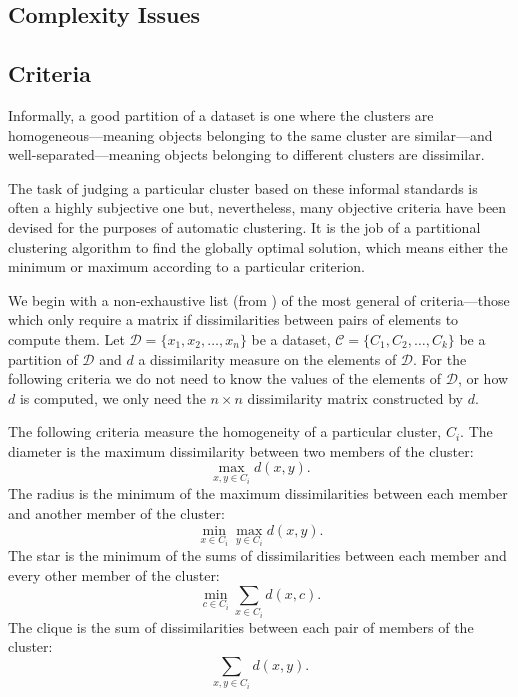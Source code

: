 \documentclass[a4paper]{report}
\newcommand{\dset}{\mathcal{D}}
\newcommand{\clus}{\mathcal{C}}
\begin{document}
\subsection{Complexity Issues}
\label{sec:complexity-issues}



\subsection{Criteria}
\label{sec:criteria}

Informally, a good partition of a dataset is one where the clusters are
homogeneous---meaning objects belonging to the same cluster are similar---and
well-separated---meaning objects belonging to different clusters are
dissimilar.

The task of judging a particular cluster based on these informal standards is
often a highly subjective one but, nevertheless, many objective criteria have
been devised for the purposes of automatic clustering.  It is the job of a
partitional clustering algorithm to find the globally optimal solution, which
means either the minimum or maximum according to a particular criterion.

We begin with a non-exhaustive list (from \citep{hansen1997mathprog}) of the
most general of criteria---those which only require a matrix if
dissimilarities between pairs of elements to compute them.  Let $\dset =
\{x_1,x_2,\dotsc,x_n\}$ be a dataset, $\clus = \{C_1,C_2,\dotsc,C_k\}$ be a
partition of $\dset$ and $d$ a dissimilarity measure on the elements of
$\dset$.  For the following criteria we do not need to know the values of the
elements of $\dset$, or how $d$ is computed, we only need the $n \times n$
dissimilarity matrix constructed by $d$.

The following criteria measure the homogeneity of a particular cluster,
$C_i$.  The diameter is the maximum dissimilarity between two members of the
cluster:
\begin{equation*}
  \max_{x,y \in C_i} d(x,y).
\end{equation*}
The radius is the minimum of the maximum dissimilarities between each member
and another member of the cluster:
\begin{equation*}
  \min_{x \in C_i} \max_{y \in C_i} d(x,y).
\end{equation*}
The star is the minimum of the sums of dissimilarities between each member
and every other member of the cluster:
\begin{equation*}
  \min_{c \in C_i} \sum_{x \in C_i} d(x,c).
\end{equation*}
The clique is the sum of dissimilarities between each pair of members of the
cluster:
\begin{equation*}
  \sum_{x,y \in C_i} d(x,y).
\end{equation*}
\end{document}
